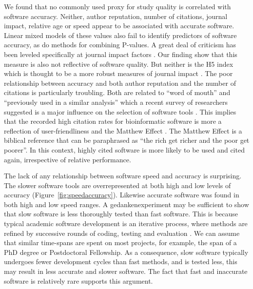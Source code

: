 \documentclass[fleqn,10pt]{SelfArx} %
\begin{document}


We found that no commonly used proxy for study quality is correlated with software accuracy. Neither, author reputation, number of citations, journal impact, relative age or speed appear to be associated with accurate software. Linear mixed models of these values also fail to identify predictors of software accuracy, as do methods for combining P-values. A great deal of criticism has been leveled specifically at journal impact factors \cite{Editors2006-ue,Rossner2007-yk,Lariviere2010-kx,Brembs:2013}. Our finding show that this measure is also not reflective of software quality. But neither is the H5 index which is thought to be a more robust measures of journal impact \cite{Harzing2008-wb}. The poor relationship between accuracy and both author reputation and the number of citations is particularly troubling. Both are related to “word of mouth” and “previously used in a similar analysis” which a recent survey of researchers suggested is a major influence on the selection of software tools \cite{Loman2015-bw}. This implies that the recorded high citation rates for bioinformatic software  \cite{Perez-Iratxeta2007-lv,Van_Noorden2014-kc,Wren2016-xy} is more a reflection of user-friendliness and the Matthew Effect \cite{Lariviere2010-kx,Merton1968-cb}. The Matthew Effect is a biblical reference that can be paraphrased as “the rich get richer and the poor get poorer”. In this context, highly cited software is more likely to be used and cited again, irrespective of relative performance. 

The lack of any relationship between software speed and accuracy is
surprising.  The slower software tools are overrepresented at both
high and low levels of accuracy
(Figure~\ref{fig:speedaccuracy}). Likewise accurate software was found
in both high and low speed ranges. A gedankenexperiment may be
sufficient to show that slow software is less thoroughly tested than
fast software. This is because typical academic software development
is an iterative process, where methods are refined by successive
rounds of coding, testing and evaluation \cite{Wilson2006-ih}. We can
assume that similar time-spans are spent on most projects, for
example, the span of a PhD degree or Postdoctoral Fellowship.  As a
consequence, slow software typically undergoes fewer development
cycles than fast methods, and is tested less, this may
result in less accurate and slower software. The fact that fast and
inaccurate software is relatively rare supports this argument.
\end{document}

